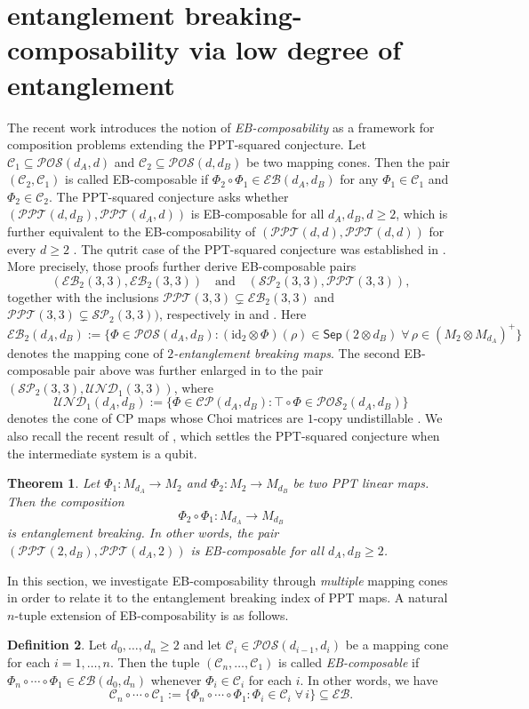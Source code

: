 \documentclass[11pt,reqno]{amsart}
\newtheorem{theorem}{Theorem}[section]
\theoremstyle{definition}
\newtheorem{definition}[theorem]{Definition}
\theoremstyle{definition}
\theoremstyle{definition}
\theoremstyle{definition}
\newcommand{\id}{\mathrm{id}}
\newcommand{\Sep}{\mathsf{Sep}}
\newcommand{\PO}{\mathcal{POS}}
\newcommand{\CP}{\mathcal{CP}}
\newcommand{\SP}{\mathcal{SP}}
\newcommand{\EB}{\mathcal{EB}}
\newcommand{\PPT}{\mathcal{PPT}}
\newcommand{\UND}{\mathcal{UND}}
\begin{document}
\section{entanglement breaking-composability via low degree of entanglement}
\label{sec:bridges}

The recent work \cite{AL26} introduces the notion of \emph{EB-composability} as a framework for composition problems extending the PPT-squared conjecture. Let $\mathcal{C}_1\subseteq \PO(d_A,d)$ and $\mathcal{C}_2\subseteq \PO(d,d_B)$ be two mapping cones. Then the pair $(\mathcal{C}_2, \mathcal{C}_1)$ is called EB-composable if $\Phi_2\circ \Phi_1\in \EB(d_A,d_B)$ for any $\Phi_1\in \mathcal{C}_1$ and $\Phi_2\in \mathcal{C}_2$. The PPT-squared conjecture asks whether $(\PPT(d,d_B), \PPT(d_A,d))$ is EB-composable for all $d_A,d_B,d\geq 2$, which is further equivalent to the EB-composability of $(\PPT(d,d),\PPT(d,d))$ for every $d\geq 2$ \cite{CMHW19}. The qutrit case of the PPT-squared conjecture was established in \cite{CMHW19,CYT19}. More precisely, those proofs further derive EB-composable pairs
    $$(\EB_2(3,3),\EB_2(3,3)) \quad \text{and} \quad (\SP_2(3,3),\PPT(3,3)),$$
together with the inclusions $\PPT(3,3)\subsetneq \EB_2(3,3)$ and $\PPT(3,3)\subsetneq \SP_2(3,3))$, respectively in \cite{CMHW19} and \cite{CYT19}. Here
    $$\EB_2(d_A,d_B):=\{\Phi\in \PO(d_A,d_B):(\id_2\otimes \Phi)(\rho)\in \Sep(2\otimes d_B)\;\forall\,\rho\in (M_{2}\otimes M_{d_A})^+\}$$
denotes the mapping cone of \emph{$2$-entanglement breaking maps}. The second EB-composable pair above was further enlarged in \cite{AL26} to the pair $(\SP_2(3,3),\UND_1(3,3))$, where
    $$\UND_1(d_A,d_B):=\{\Phi\in \CP(d_A,d_B): \top\circ \Phi\in \PO_2(d_A,d_B)\}$$
denotes the cone of CP maps whose Choi matrices are $1$-copy undistillable \cite{HHH98}. We also recall the recent result of \cite{Henry26}, which settles the PPT-squared conjecture when the intermediate system is a qubit.

\begin{theorem} \label{thm:Hen26}
Let $\Phi_1:M_{d_A}\to M_2$ and $\Phi_2: M_2 \to M_{d_B}$ be two PPT linear maps. Then the composition 
    $$\Phi_2\circ \Phi_1:M_{d_A}\to M_{d_B}$$
is entanglement breaking. In other words, the pair $(\PPT(2,d_B), \PPT(d_A,2))$ is EB-composable for all $d_A,d_B\geq 2$.
\end{theorem}


In this section, we investigate EB-composability through \emph{multiple} mapping cones in order to relate it to the entanglement breaking index of PPT maps. A natural $n$-tuple extension of EB-composability is as follows.
\begin{definition}
Let $d_0,\ldots, d_n\geq 2$ and let $\mathcal{C}_i\in \PO(d_{i-1},d_{i})$ be a mapping cone for each $i=1,\ldots, n$. Then the tuple $(\mathcal{C}_n,\ldots, \mathcal{C}_1)$ is called \emph{EB-composable} if $\Phi_n\circ \cdots \circ\Phi_1\in \EB(d_0,d_n)$ whenever $\Phi_i\in \mathcal{C}_i$ for each $i$. In other words, we have
    $$\mathcal{C}_n\circ \cdots \circ \mathcal{C}_1:=\{\Phi_n\circ \cdots \circ \Phi_1:\Phi_i\in \mathcal{C}_i\;\forall\,i\}\subseteq \EB.$$
\end{definition}
\end{document}
